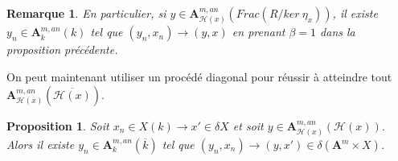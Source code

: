 \documentclass[11pt]{article}
\newcommand{\ana}{\mathbf{A}}
\newtheorem{prop}[thm]{Proposition}
\newtheorem{rem}[thm]{Remarque}
\begin{document}
\begin{rem}
En particulier, si $y \in \ana^{m,an}_{\mathcal{H}(x)}(Frac(R/ker~\eta_x))$, il existe $y_n \in \ana^{m,an}_k(k)$ tel que $(y_n, x_n) \rightarrow (y,x)$ en prenant $\beta = 1$ dans la proposition précédente.
\end{rem}
On peut maintenant utiliser un procédé diagonal pour réussir à atteindre tout $\ana^{m,an}_{\mathcal{H}(x)}(\overline{\mathcal{H}(x)}).$
\begin{prop}\label{existence convergence vers y dans H(x)^m}
Soit $x_n \in X(k) \rightarrow x' \in \delta X$ et soit $y\in \ana^{m,an}_{\mathcal{H}(x)}(\mathcal{H}(x))$. Alors il existe $y_n \in \ana^{m,an}_k(\overline{k})$ tel que $(y_n, x_n) \rightarrow (y,x') \in \delta (\ana^m \times X)$.
\end{prop}
\end{document}
